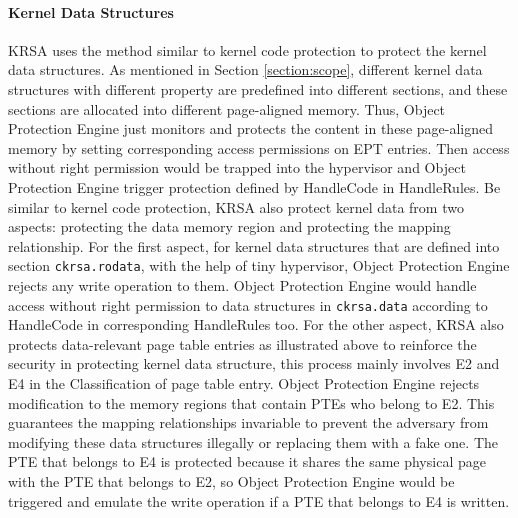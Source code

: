 \documentclass[conference]{IEEEtran}
\begin{document}
\paragraph{Kernel Data Structures}
KRSA uses the method similar to kernel code protection to protect the kernel data structures. 
As mentioned in Section \ref{section:scope}, different kernel data structures with different property are predefined into different sections, and these sections are allocated into different page-aligned memory. Thus, Object Protection Engine just monitors and protects the content in these page-aligned memory by setting corresponding access permissions on EPT entries. Then access without right permission would be trapped into the hypervisor and Object Protection Engine trigger protection defined by HandleCode in HandleRules. 
Be similar to kernel code protection, KRSA also protect kernel data from two aspects: protecting the data memory region and protecting the mapping relationship. 
For the first aspect, for kernel data structures that are defined into section \verb|ckrsa.rodata|, with the help of tiny hypervisor, Object Protection Engine rejects any write operation to them. Object Protection Engine would handle access without right permission to data structures in \verb|ckrsa.data| according to HandleCode in corresponding HandleRules too. 
For the other aspect, KRSA also protects data-relevant page table entries as illustrated above to reinforce the security in protecting kernel data structure, this process mainly involves E2 and E4 in the Classification of page table entry. 
Object Protection Engine rejects modification to the memory regions that contain PTEs who belong to E2. This guarantees the mapping relationships invariable to prevent the adversary from modifying these data structures illegally or replacing them with a fake one.
The PTE that belongs to E4 is protected because it shares the same physical page with the PTE that belongs to E2, so Object Protection Engine would be triggered and emulate the write operation if a PTE that belongs to E4 is written. 
\end{document}
